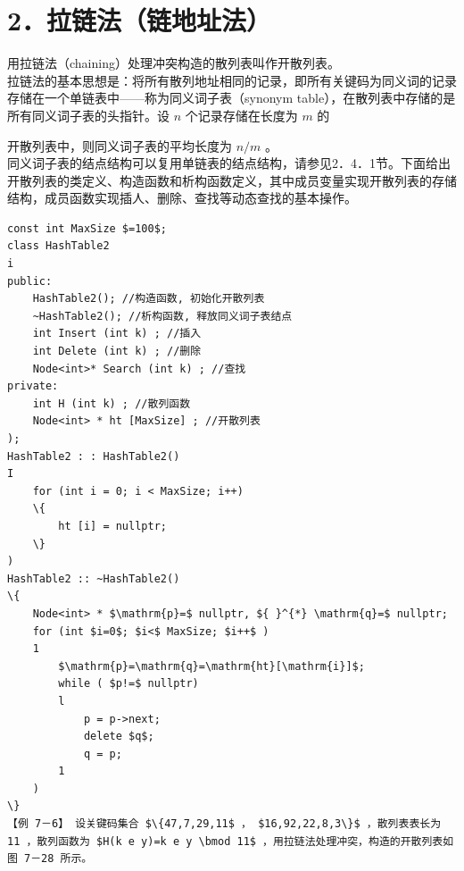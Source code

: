 \documentclass[10pt]{article}
\begin{document}
\section*{2．拉链法（链地址法）}
用拉链法（chaining）处理冲突构造的散列表叫作开散列表。\\
拉链法的基本思想是：将所有散列地址相同的记录，即所有关键码为同义词的记录存储在一个单链表中——称为同义词子表（synonym table），在散列表中存储的是所有同义词子表的头指针。设 $n$ 个记录存储在长度为 $m$ 的

开散列表中，则同义词子表的平均长度为 $n / m$ 。\\
同义词子表的结点结构可以复用单链表的结点结构，请参见2．4．1节。下面给出开散列表的类定义、构造函数和析构函数定义，其中成员变量实现开散列表的存储结构，成员函数实现插人、删除、查找等动态查找的基本操作。

\begin{verbatim}
const int MaxSize $=100$;
class HashTable2
i
public:
    HashTable2(); //构造函数, 初始化开散列表
    ~HashTable2(); //析构函数, 释放同义词子表结点
    int Insert (int k) ; //插入
    int Delete (int k) ; //删除
    Node<int>* Search (int k) ; //查找
private:
    int H (int k) ; //散列函数
    Node<int> * ht [MaxSize] ; //开散列表
);
HashTable2 : : HashTable2()
I
    for (int i = 0; i < MaxSize; i++)
    \{
        ht [i] = nullptr;
    \}
)
HashTable2 :: ~HashTable2()
\{
    Node<int> * $\mathrm{p}=$ nullptr, ${ }^{*} \mathrm{q}=$ nullptr;
    for (int $i=0$; $i<$ MaxSize; $i++$ )
    1
        $\mathrm{p}=\mathrm{q}=\mathrm{ht}[\mathrm{i}]$;
        while ( $p!=$ nullptr)
        l
            p = p->next;
            delete $q$;
            q = p;
        1
    )
\}
【例 7－6】 设关键码集合 $\{47,7,29,11$ ， $16,92,22,8,3\}$ ，散列表表长为 11 ，散列函数为 $H(k e y)=k e y \bmod 11$ ，用拉链法处理冲突，构造的开散列表如图 7－28 所示。
\end{verbatim}
\end{document}
